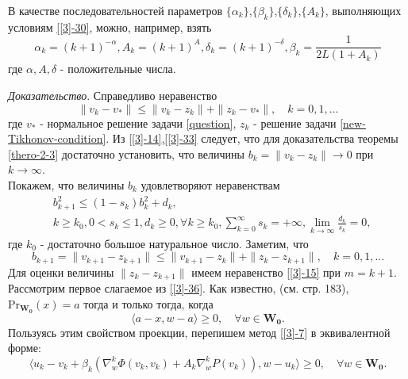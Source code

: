 \begin{remark}
\label{remark 3-2}
В качестве последовательностей параметров $\{\alpha_k\}$,$\{\beta_k\}$,$\{\delta_k\}$,$\{A_k\}$, выполняющих условиям \eqref{[3]-30}, можно, например, взять
\begin{equation*}
	\alpha_k = (k+1)^{-\alpha},A_k=(k+1)^A,\delta_k=(k+1)^{-\delta},\beta_k=\frac{1}{2L(1+A_k)}
\end{equation*}
где $\alpha,A,\delta$ - положительные числа. %
\end{remark}
\noindent\emph{Доказательство}. Справедливо неравенство
\begin{equation}
\label{[3]-33}
\|v_k-v_*\|\leqslant \|v_k-z_k\|+\|z_k-v_*\|,\quad k=0,1,...
\end{equation}
где $v_*$ - нормальное решение задачи \eqref{question}, $z_k$ - решение задачи \eqref{new-Tikhonov-condition}. Из \eqref{[3]-14},\eqref{[3]-33} следует, что для доказательства теоремы \ref{thero-2-3} достаточно установить, что величины $b_k=\|v_k-z_k\|\to 0$ при $k\to \infty$.\\
Покажем, что величины $b_k$ удовлетворяют неравенствам
\begin{equation}
\label{[3]-34}
\begin{aligned}
&b_{k+1}^2\leqslant (1-s_k)b_k^2+d_k,\\
&k\geqslant k_0,0<s_k\leqslant 1,d_k\geqslant 0,\forall k\geqslant k_0,\sum_{k=0}^{\infty}s_k=+\infty,\lim_{k\to \infty}\frac{d_k}{s_k}=0,
\end{aligned}
\end{equation}
где $k_0$ - достаточно большое натуральное число. Заметим, что 
\begin{equation}
\label{[3]-36}
b_{k+1}=\|v_{k+1}-z_{k+1}\|\leqslant \|v_{k+1}-z_k\|+\|z_k-z_{k+1}\|,\quad k=0,1,...
\end{equation}
Для оценки величины $\|z_k-z_{k+1}\|$ имеем неравенство \eqref{[3]-15} при $m=k+1$. Рассмотрим первое слагаемое из \eqref{[3]-36}. Как известно, (см. \cite{5} стр. 183), $\mathrm{Pr}_{\mathbf{W_0}}(x)=a$ тогда и только тогда, когда 
\begin{equation*}
\langle a-x,w-a \rangle\geqslant 0,\quad \forall w\in\mathbf{W_0}.
\end{equation*}
Пользуясь этим свойством проекции, перепишем метод \eqref{[3]-7} в эквивалентной форме:
\begin{equation}
\label{[3]-37}
\big\langle u_k-v_k+\beta_k(\nabla_w^k\Phi(v_k,v_k)+A_k\nabla_w^kP(v_k)),w-u_k\big\rangle\geqslant 0,\quad \forall w\in\mathbf{W_0}.
\end{equation}
